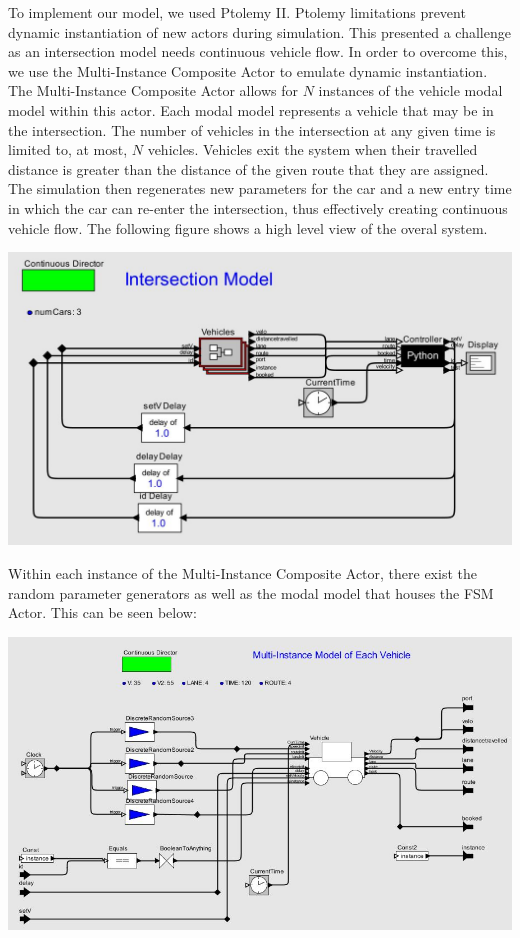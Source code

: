 To implement our model, we used Ptolemy II.  Ptolemy limitations prevent dynamic instantiation of new actors during simulation.  This presented a challenge as an intersection model needs continuous vehicle flow.  In order to overcome this, we use the Multi-Instance Composite Actor to emulate dynamic instantiation.  The Multi-Instance Composite Actor allows for $N$ instances of the vehicle modal model within this actor.  Each modal model represents a vehicle that may be in the intersection.  The number of vehicles in the intersection at any given time is limited to, at most, $N$ vehicles.  Vehicles exit the system when their travelled distance is greater than the distance of the given route that they are assigned.  The simulation then regenerates new parameters for the car and a new entry time in which the car can re-enter the intersection, thus effectively creating continuous vehicle flow. The following figure shows a high level view of the overal system.

\begin{center}
\includegraphics[width=0.65\linewidth]{diagram/ptolemy_system.jpg}
\end{center}

Within each instance of the Multi-Instance Composite Actor, there exist the random parameter generators as well as the modal model that houses the FSM Actor.  This can be seen below:
\begin{center}
\includegraphics[width=0.65\linewidth]{diagram/ptolemy_multiinstance_actor.jpg}
\end{center}

